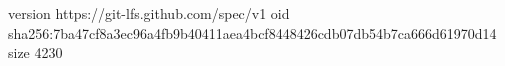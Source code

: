 version https://git-lfs.github.com/spec/v1
oid sha256:7ba47cf8a3ec96a4fb9b40411aea4bcf8448426cdb07db54b7ca666d61970d14
size 4230
